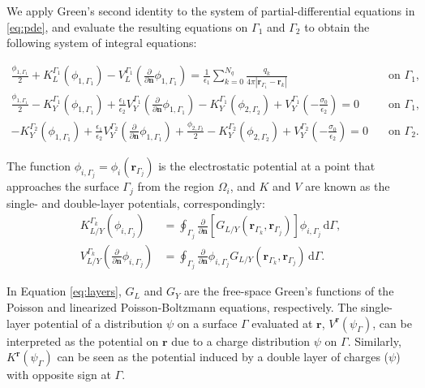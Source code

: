 

We apply Green's second identity to the system of partial-differential equations in \eqref{eq:pde}, and evaluate the resulting equations on $\Gamma_1$ and $\Gamma_2$ to obtain the following system of integral equations:
%
\begin{widetext}
\begin{align} \label{eq:integral_eq}
\frac{\phi_{1,\Gamma_1}}{2}+ K_{L}^{\Gamma_1}(\phi_{1,\Gamma_1}) -  V_{L}^{\Gamma_1} \left(\frac{\partial}{\partial \mathbf{n}}\phi_{1,\Gamma_1} \right)  =  
\frac{1}{\epsilon_1} \sum_{k=0}^{N_q} \frac{q_k}{4\pi|\mathbf{r}_{\Gamma_1} - \mathbf{r}_k|} &  \quad \text{on $\Gamma_1$,} \nonumber \\ 
\frac{\phi_{1,\Gamma_1}}{2} - K_{Y}^{\Gamma_1}(\phi_{1,\Gamma_1}) +  \frac{\epsilon_1}{\epsilon_2} V_{Y}^{\Gamma_1} \left( \frac{\partial}{\partial \mathbf{n}} \phi_{1,\Gamma_1} \right) -  
K_{Y}^{\Gamma_1}(\phi_{2,\Gamma_2})  + V_{Y}^{\Gamma_1} \left( -\frac{\sigma_0}{\epsilon_2} \right)  = 0& \quad \text{on $\Gamma_1$,} \nonumber \\ 
- K_{Y}^{\Gamma_2}(\phi_{1,\Gamma_1}) + \frac{\epsilon_1}{\epsilon_2} V_{Y}^{\Gamma_2}  \left( \frac{\partial}{\partial \mathbf{n}} \phi_{1,\Gamma_1} \right) + \frac{\phi_{2,\Gamma_2}}{2} - 
K_{Y}^{\Gamma_2}(\phi_{2,\Gamma_2}) +  V_{Y}^{\Gamma_2} \left( -\frac{\sigma_0}{\epsilon_2} \right)  = 0& \quad \text{on $\Gamma_2$.}
\end{align}
\end{widetext}


\noindent The function $\phi_{i,\Gamma_j} = \phi_i(\mathbf{r}_{\Gamma_j})$ is the electrostatic potential at a point that approaches the surface $\Gamma_j$ from the region $\Omega_i$, and
$K$ and $V$ are known as the single- and double-layer potentials, correspondingly:
%
\begin{align} \label{eq:layers}
K_{L/Y}^{\Gamma_k}(\phi_{i,\Gamma_j}) &= \oint_{\Gamma_j} \frac{\partial}{\partial \mathbf{n}} \left[ G_{L/Y}(\mathbf{r}_{\Gamma_k},\mathbf{r}_{\Gamma_j}) \right]\phi_{i,\Gamma_j} \, \mathrm{d} \Gamma, \nonumber \\
V_{L/Y}^{\Gamma_k} \left( \frac{\partial}{\partial \mathbf{n}} \phi_{i,\Gamma_j} \right) &= \oint_{\Gamma_j} \frac{\partial}{\partial \mathbf{n}} \phi_{i,\Gamma_j} G_{L/Y}(\mathbf{r}_{\Gamma_k},\mathbf{r}_{\Gamma_j})  \, \mathrm{d} \Gamma.
\end{align}

\noindent In Equation \eqref{eq:layers}, $G_L$ and $G_Y$ are the free-space Green's functions of the Poisson and linearized Poisson-Boltzmann equations, respectively. 
The single-layer potential of a distribution $\psi$ on a surface $\Gamma$ evaluated at $\mathbf{r}$, $V^\mathbf{r}(\psi_\Gamma)$, can be interpreted as the potential on $\mathbf{r}$ due to a charge distribution $\psi$ on $\Gamma$. 
Similarly, $K^\mathbf{r}(\psi_\Gamma)$ can be seen as the potential induced by a double layer of charges ($\psi$) with opposite sign at $\Gamma$.

